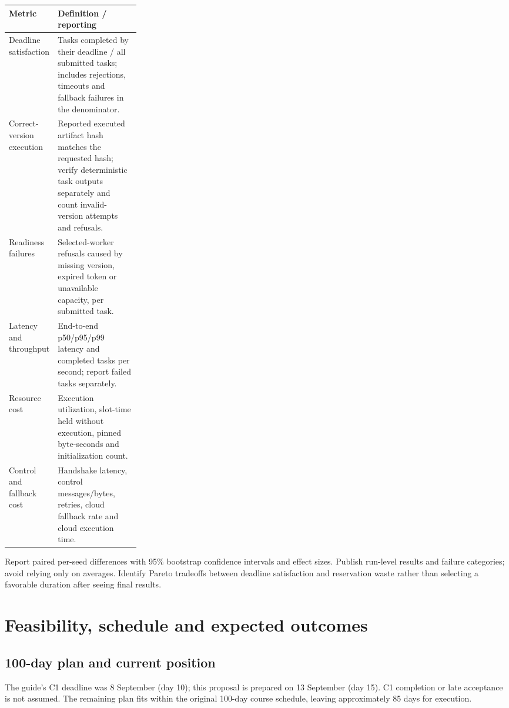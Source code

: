 \documentclass[11pt,a4paper]{article}
\begin{document}
\begin{center}
\small
\begin{tabularx}{\linewidth}{|p{0.26\linewidth}|X|}
\hline
\textbf{Metric} & \textbf{Definition / reporting} \\ \hline
Deadline satisfaction & Tasks completed by their deadline / all submitted tasks; includes rejections, timeouts and fallback failures in the denominator. \\ \hline
Correct-version execution & Reported executed artifact hash matches the requested hash; verify deterministic task outputs separately and count invalid-version attempts and refusals. \\ \hline
Readiness failures & Selected-worker refusals caused by missing version, expired token or unavailable capacity, per submitted task. \\ \hline
Latency and throughput & End-to-end p50/p95/p99 latency and completed tasks per second; report failed tasks separately. \\ \hline
Resource cost & Execution utilization, slot-time held without execution, pinned byte-seconds and initialization count. \\ \hline
Control and fallback cost & Handshake latency, control messages/bytes, retries, cloud fallback rate and cloud execution time. \\ \hline
\end{tabularx}
\end{center}

Report paired per-seed differences with 95\% bootstrap confidence intervals and effect sizes. Publish run-level results and failure categories; avoid relying only on averages. Identify Pareto tradeoffs between deadline satisfaction and reservation waste rather than selecting a favorable duration after seeing final results.

\section{Feasibility, schedule and expected outcomes}

\subsection{100-day plan and current position}

The guide's C1 deadline was 8 September (day 10); this proposal is prepared on 13 September (day 15). C1 completion or late acceptance is not assumed. The remaining plan fits within the original 100-day course schedule, leaving approximately 85 days for execution.
\end{document}
